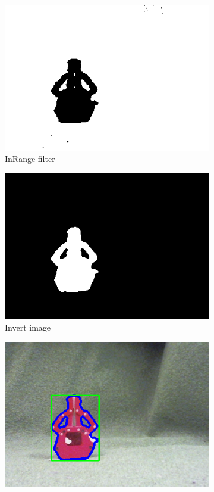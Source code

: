 \documentclass[runningheads,a4paper]{llncs}
\begin{document}
\begin{figure}[h!]
  \centering
  \begin{subfigure}[b]{0.3\linewidth}
    \includegraphics[width=\linewidth]{images/bounding_inrange.png}
    \caption{InRange filter}
  \end{subfigure}
  \begin{subfigure}[b]{0.3\linewidth}
    \includegraphics[width=\linewidth]{images/bounding_invert.png}
    \caption{Invert image}
  \end{subfigure}
  \begin{subfigure}[b]{0.3\linewidth}
    \includegraphics[width=\linewidth]{images/bounding_contours.png}

\end{subfigure}
\end{figure}
\end{document}
